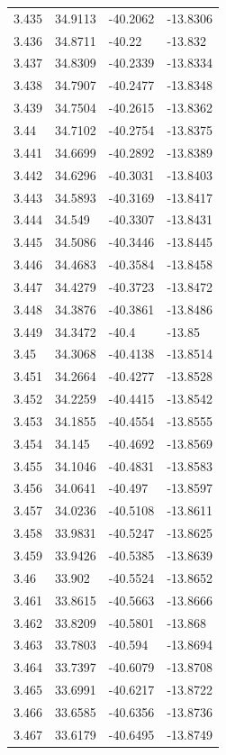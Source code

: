 \begin{tabular}{llll}
3.435 & 34.9113 & -40.2062 & -13.8306 \\
3.436 & 34.8711 & -40.22 & -13.832 \\
3.437 & 34.8309 & -40.2339 & -13.8334 \\
3.438 & 34.7907 & -40.2477 & -13.8348 \\
3.439 & 34.7504 & -40.2615 & -13.8362 \\
3.44 & 34.7102 & -40.2754 & -13.8375 \\
3.441 & 34.6699 & -40.2892 & -13.8389 \\
3.442 & 34.6296 & -40.3031 & -13.8403 \\
3.443 & 34.5893 & -40.3169 & -13.8417 \\
3.444 & 34.549 & -40.3307 & -13.8431 \\
3.445 & 34.5086 & -40.3446 & -13.8445 \\
3.446 & 34.4683 & -40.3584 & -13.8458 \\
3.447 & 34.4279 & -40.3723 & -13.8472 \\
3.448 & 34.3876 & -40.3861 & -13.8486 \\
3.449 & 34.3472 & -40.4 & -13.85 \\
3.45 & 34.3068 & -40.4138 & -13.8514 \\
3.451 & 34.2664 & -40.4277 & -13.8528 \\
3.452 & 34.2259 & -40.4415 & -13.8542 \\
3.453 & 34.1855 & -40.4554 & -13.8555 \\
3.454 & 34.145 & -40.4692 & -13.8569 \\
3.455 & 34.1046 & -40.4831 & -13.8583 \\
3.456 & 34.0641 & -40.497 & -13.8597 \\
3.457 & 34.0236 & -40.5108 & -13.8611 \\
3.458 & 33.9831 & -40.5247 & -13.8625 \\
3.459 & 33.9426 & -40.5385 & -13.8639 \\
3.46 & 33.902 & -40.5524 & -13.8652 \\
3.461 & 33.8615 & -40.5663 & -13.8666 \\
3.462 & 33.8209 & -40.5801 & -13.868 \\
3.463 & 33.7803 & -40.594 & -13.8694 \\
3.464 & 33.7397 & -40.6079 & -13.8708 \\
3.465 & 33.6991 & -40.6217 & -13.8722 \\
3.466 & 33.6585 & -40.6356 & -13.8736 \\
3.467 & 33.6179 & -40.6495 & -13.8749 \\

\end{tabular}

